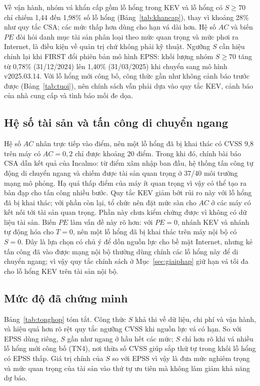 \documentclass[conference]{IEEEtran}
\begin{document}
Về vận hành, nhóm vá khẩn cấp gồm lỗ hổng trong KEV và lỗ hổng có $S \ge 70$ chỉ chiếm 1,44 đến 1,98\%
số lỗ hổng (Bảng~\ref{tab:khancap}), thay vì khoảng 28\% như quy tắc CSA; các mức thấp hơn dùng cho
hạn vá dài hơn. Hệ số $AC$ và biến $\mathit{PE}$ đòi hỏi danh mục tài sản phân loại theo mức quan trọng và mức phơi ra Internet, là điều kiện về quản trị chứ không phải kỹ thuật. Ngưỡng $S$ cần hiệu chỉnh lại khi FIRST
đổi phiên bản mô hình EPSS: khối lượng nhóm $S \ge 70$ tăng từ 0,78\% (31/12/2024) lên 1,40\%
(31/03/2025) khi chuyển sang mô hình v2025.03.14. Với lỗ hổng mới công bố, công thức gần như không cảnh báo trước được
(Bảng~\ref{tab:tuoi}), nên chính sách vẫn phải dựa vào quy tắc KEV, cảnh báo của nhà cung cấp và
tình báo mối đe dọa.

\subsection{Hệ số tài sản và tấn công di chuyển ngang}
Hệ số $AC$ nhân trực tiếp vào điểm, nên một lỗ hổng đã bị khai thác có CVSS 9,8 trên máy có
$AC = 0{,}2$ chỉ được khoảng 20 điểm. Trong khi đó, chính bài báo CSA dẫn kết quả của Incalmo: từ điểm xâm nhập ban đầu, hệ thống tấn công tự động di chuyển ngang và chiếm được tài sản quan trọng ở 37/40 môi
trường mạng mô phỏng. Hạ quá thấp điểm của máy ít quan trọng vì vậy có thể tạo ra bàn đạp cho tấn công nhiều bước. Quy tắc KEV giảm bớt rủi ro này với lỗ hổng đã bị khai thác; với phần còn lại, tổ
chức nên đặt mức sàn cho $AC$ ở các máy có kết nối tới tài sản quan trọng. Phần này chưa kiểm chứng
được vì không có dữ liệu tài sản. Biến $\mathit{PE}$ làm vấn đề này rõ hơn: với $\mathit{PE} = 0$, nhánh KEV và nhánh tự động hóa cho $T = 0$, nên một lỗ hổng đã bị khai thác trên máy nội bộ có $S = 0$. Đây là lựa chọn có chủ ý để dồn nguồn lực cho bề mặt Internet, nhưng kẻ tấn công đã vào được mạng nội bộ thường dùng chính các lỗ hổng này để di chuyển ngang; vì vậy quy tắc chính sách ở Mục~\ref{sec:giaiphap} giữ hạn vá tối đa cho lỗ hổng KEV trên tài sản nội bộ.

\subsection{Mức độ đã chứng minh}
Bảng~\ref{tab:tonghop} tóm tắt. Công thức $S$ khả thi về dữ liệu, chi phí và vận hành, và hiệu quả
hơn rõ rệt quy tắc ngưỡng CVSS khi nguồn lực vá có hạn. So với EPSS dùng riêng, $S$ gần như ngang ở
hầu hết các mức; $S$ chỉ hơn rõ khi vá nhiều lỗ hổng mới công bố (TN4), nơi thừa số CVSS giúp sắp thứ
tự trong khối lỗ hổng có EPSS thấp. Giá trị chính của $S$ so với EPSS vì vậy là đưa mức nghiêm trọng
và mức quan trọng của tài sản vào thứ tự ưu tiên mà không làm giảm khả năng dự báo.
\end{document}
